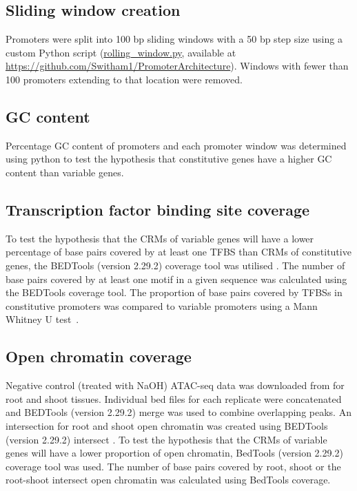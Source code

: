 \documentclass[../main.tex]{subfiles}
\begin{document}
\subsection{Sliding window creation}
\label{chapter1:methods:sliding-window-creation}
Promoters were split into 100 bp sliding windows with a 50 bp step size using a custom Python script (\href{https://github.com/Switham1/PromoterArchitecture/blob/master/src/rolling_window/rolling_window.py}{rolling\_window.py}, available at \url{https://github.com/Switham1/PromoterArchitecture}).
Windows with fewer than 100 promoters extending to that location were removed.

\subsection{GC content}
{\label{chapter1:methods:gc-content}}
Percentage GC content of promoters and each promoter window was determined using python to test the hypothesis that constitutive genes have a higher GC content than variable genes.


\subsection{Transcription factor binding site coverage}
{\label{chapter1:methods:transcription-factor-binding-site-coverage}}

To test the hypothesis that the CRMs of variable genes will have a lower percentage of base pairs covered by at least one TFBS than CRMs of constitutive genes, the BEDTools (version 2.29.2) coverage tool was utilised \autocite{quinlanBEDToolsFlexibleSuite2010}.
The number of base pairs covered by at least one motif in a given sequence was calculated using the BEDTools coverage tool.
The proportion of base pairs covered by TFBSs in constitutive promoters was compared to variable promoters using a Mann Whitney U test~\autocite{mannTestWhetherOne1947}.

\subsection{Open chromatin coverage}
{\label{chapter1:methods:open-chromatin-coverage}}
Negative control (treated with NaOH) ATAC\hyp{}seq data was downloaded from \textcite{potterCytokininModulatesContextdependent2018} for root and shoot tissues.
Individual bed files for each replicate were concatenated and BEDTools (version 2.29.2) merge \autocite{quinlanBEDToolsFlexibleSuite2010} was used to combine overlapping peaks.
An intersection for root and shoot open chromatin was created using BEDTools (version 2.29.2) intersect \autocite{quinlanBEDToolsFlexibleSuite2010}.
To test the hypothesis that the CRMs of variable genes will have a lower proportion of open chromatin, BedTools (version 2.29.2) coverage tool \autocite{quinlanBEDToolsFlexibleSuite2010} was used.
The number of base pairs covered by root, shoot or the root\hyp{}shoot intersect open chromatin was calculated using BedTools coverage.
\end{document}
